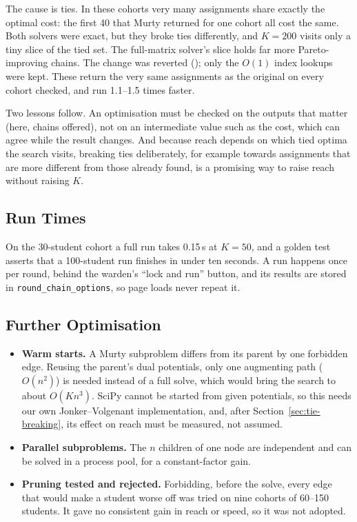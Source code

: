 The cause is ties. In these cohorts very many assignments share exactly
the optimal cost: the first 40 that Murty returned for one cohort all
cost the same. Both solvers were exact, but they broke ties differently,
and $K = 200$ visits only a tiny slice of the tied set. The full-matrix
solver's slice holds far more Pareto-improving chains. The change was
reverted (); only the $O(1)$ index lookups were kept.
These return the very same assignments as the original on every cohort
checked, and run 1.1--1.5 times faster.

Two lessons follow. An optimisation must be checked on the outputs that
matter (here, chains offered), not on an intermediate value such as the
cost, which can agree while the result changes. And because reach
depends on which tied optima the search visits, breaking ties
deliberately, for example towards assignments that are more different
from those already found, is a promising way to raise reach without
raising $K$.

\subsection{Run Times}

On the 30-student cohort a full run takes 0.15\,s at $K = 50$, and a
golden test asserts that a 100-student run finishes in under ten
seconds. A run happens once per round, behind the warden's ``lock and
run'' button, and its results are stored in
\texttt{round\_chain\_options}, so page loads never repeat it.

\subsection{Further Optimisation}

\begin{itemize}
  \item \textbf{Warm starts.} A Murty subproblem differs from its parent
  by one forbidden edge. Reusing the parent's dual potentials, only one
  augmenting path ($O(n^2)$) is needed instead of a full solve, which
  would bring the search to about $O(Kn^3)$. SciPy cannot be started
  from given potentials, so this needs our own Jonker--Volgenant
  implementation, and, after Section~\ref{sec:tie-breaking}, its effect
  on reach must be measured, not assumed.
  \item \textbf{Parallel subproblems.} The $n$ children of one node are
  independent and can be solved in a process pool, for a constant-factor
  gain.
  \item \textbf{Pruning tested and rejected.} Forbidding, before the
  solve, every edge that would make a student worse off was tried on
  nine cohorts of 60--150 students. It gave no consistent gain in reach
  or speed, so it was not adopted.
\end{itemize}

